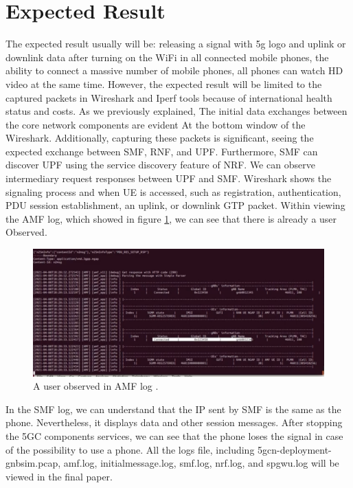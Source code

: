 \section{\textbf{Expected Result}}\label{Expected Result}


The expected result usually will be:  releasing a signal with 5g logo and uplink or downlink data after turning on the WiFi in all connected mobile phones, the ability to connect a massive number of mobile phones, all phones can watch HD video at the same time. However, the expected result will be limited to the captured packets in Wireshark and Iperf tools because of international health status and costs.
As we previously explained, The initial data exchanges between the core network components are evident At the bottom window of the Wireshark. Additionally, capturing these packets is significant, seeing the expected exchange between SMF, RNF, and UPF. Furthermore, SMF can discover UPF using the service discovery feature of NRF. We can observe intermediary request responses between UPF and SMF. Wireshark shows the signaling process and when UE is accessed, such as registration, authentication, PDU session establishment, an uplink, or downlink GTP packet. Within viewing the AMF log, which showed in figure  \ref{fig:amf_log_user_observed}, we can see that there is already a user Observed.
 

 


\begin{figure}
\centering
\includegraphics[scale=0.33]{images/amf_log_user_observed.png}
\caption{A user observed in AMF log \cite{openairinterface2014}.}
\label{fig:amf_log_user_observed}
\end{figure}

 
In the SMF log, we can understand that the IP sent by SMF is the same as the phone. 
Nevertheless, it displays data and other session messages. After stopping the 5GC components services, we can see that the phone loses the signal in case of the possibility to use a phone. All the logs file, including 5gcn-deployment-gnbsim.pcap, amf.log, initialmessage.log, smf.log, nrf.log, and spgwu.log will be viewed in the final paper.
   
 